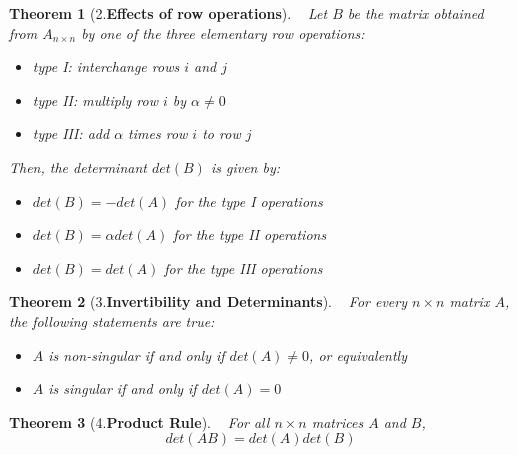 \documentclass[10.5pt]{article}
\newtheorem{theo}{Theorem}
\newenvironment{definition}[2][Definition]{\begin{trivlist}
\item[\hskip \labelsep {\bfseries #1}\hskip \labelsep {\bfseries #2.}]}{\end{trivlist}}
\newenvironment{lemma}[2][Lemma]{\begin{trivlist}
\item[\hskip \labelsep {\bfseries #1}\hskip \labelsep {\bfseries #2.}]}{\end{trivlist}}
\begin{document}

\begin{theo}[2.\textbf{Effects of row operations}]
~ Let $B$ be the matrix obtained from $A_{n\times n}$ by one of the three elementary row operations:
\begin{itemize}
\item type I: interchange rows $i$ and $j$
\item type II: multiply row $i$ by $\alpha \neq 0$
\item type III: add $\alpha $ times row $i$ to row $j$
\end{itemize}
Then, the determinant $det(B)$ is given by:
\begin{itemize}
\item $det(B)=-det(A)$ for the type I operations
\item $det(B)=\alpha det(A)$ for the type II operations
\item $det(B)=det(A)$ for the type III operations
\end{itemize}
\end{theo}

\begin{theo}[3.\textbf{Invertibility and Determinants}]
~ For every $n\times n$ matrix $A$, the following statements are true:
\begin{itemize}
\item $A$ is non-singular if and only if $det(A)\neq 0$, or equivalently
\item $A$ is singular if and only if $det(A)=0$
\end{itemize}
\end{theo}

\begin{theo}[4.\textbf{Product Rule}]
~ For all $n\times n$ matrices $A$ and $B$,
$$det(AB)=det(A)det(B)$$
\end{theo}

\end{document}
